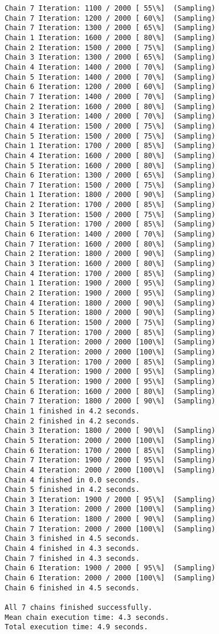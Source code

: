 \documentclass[11pt]{article}
\begin{document}
\begin{Verbatim}[commandchars=\\\{\}]
Chain 7 Iteration: 1100 / 2000 [ 55\%]  (Sampling)
Chain 7 Iteration: 1200 / 2000 [ 60\%]  (Sampling)
Chain 7 Iteration: 1300 / 2000 [ 65\%]  (Sampling)
Chain 1 Iteration: 1600 / 2000 [ 80\%]  (Sampling)
Chain 2 Iteration: 1500 / 2000 [ 75\%]  (Sampling)
Chain 3 Iteration: 1300 / 2000 [ 65\%]  (Sampling)
Chain 4 Iteration: 1400 / 2000 [ 70\%]  (Sampling)
Chain 5 Iteration: 1400 / 2000 [ 70\%]  (Sampling)
Chain 6 Iteration: 1200 / 2000 [ 60\%]  (Sampling)
Chain 7 Iteration: 1400 / 2000 [ 70\%]  (Sampling)
Chain 2 Iteration: 1600 / 2000 [ 80\%]  (Sampling)
Chain 3 Iteration: 1400 / 2000 [ 70\%]  (Sampling)
Chain 4 Iteration: 1500 / 2000 [ 75\%]  (Sampling)
Chain 5 Iteration: 1500 / 2000 [ 75\%]  (Sampling)
Chain 1 Iteration: 1700 / 2000 [ 85\%]  (Sampling)
Chain 4 Iteration: 1600 / 2000 [ 80\%]  (Sampling)
Chain 5 Iteration: 1600 / 2000 [ 80\%]  (Sampling)
Chain 6 Iteration: 1300 / 2000 [ 65\%]  (Sampling)
Chain 7 Iteration: 1500 / 2000 [ 75\%]  (Sampling)
Chain 1 Iteration: 1800 / 2000 [ 90\%]  (Sampling)
Chain 2 Iteration: 1700 / 2000 [ 85\%]  (Sampling)
Chain 3 Iteration: 1500 / 2000 [ 75\%]  (Sampling)
Chain 5 Iteration: 1700 / 2000 [ 85\%]  (Sampling)
Chain 6 Iteration: 1400 / 2000 [ 70\%]  (Sampling)
Chain 7 Iteration: 1600 / 2000 [ 80\%]  (Sampling)
Chain 2 Iteration: 1800 / 2000 [ 90\%]  (Sampling)
Chain 3 Iteration: 1600 / 2000 [ 80\%]  (Sampling)
Chain 4 Iteration: 1700 / 2000 [ 85\%]  (Sampling)
Chain 1 Iteration: 1900 / 2000 [ 95\%]  (Sampling)
Chain 2 Iteration: 1900 / 2000 [ 95\%]  (Sampling)
Chain 4 Iteration: 1800 / 2000 [ 90\%]  (Sampling)
Chain 5 Iteration: 1800 / 2000 [ 90\%]  (Sampling)
Chain 6 Iteration: 1500 / 2000 [ 75\%]  (Sampling)
Chain 7 Iteration: 1700 / 2000 [ 85\%]  (Sampling)
Chain 1 Iteration: 2000 / 2000 [100\%]  (Sampling)
Chain 2 Iteration: 2000 / 2000 [100\%]  (Sampling)
Chain 3 Iteration: 1700 / 2000 [ 85\%]  (Sampling)
Chain 4 Iteration: 1900 / 2000 [ 95\%]  (Sampling)
Chain 5 Iteration: 1900 / 2000 [ 95\%]  (Sampling)
Chain 6 Iteration: 1600 / 2000 [ 80\%]  (Sampling)
Chain 7 Iteration: 1800 / 2000 [ 90\%]  (Sampling)
Chain 1 finished in 4.2 seconds.
Chain 2 finished in 4.2 seconds.
Chain 3 Iteration: 1800 / 2000 [ 90\%]  (Sampling)
Chain 5 Iteration: 2000 / 2000 [100\%]  (Sampling)
Chain 6 Iteration: 1700 / 2000 [ 85\%]  (Sampling)
Chain 7 Iteration: 1900 / 2000 [ 95\%]  (Sampling)
Chain 4 Iteration: 2000 / 2000 [100\%]  (Sampling)
Chain 4 finished in 0.0 seconds.
Chain 5 finished in 4.2 seconds.
Chain 3 Iteration: 1900 / 2000 [ 95\%]  (Sampling)
Chain 3 Iteration: 2000 / 2000 [100\%]  (Sampling)
Chain 6 Iteration: 1800 / 2000 [ 90\%]  (Sampling)
Chain 7 Iteration: 2000 / 2000 [100\%]  (Sampling)
Chain 3 finished in 4.5 seconds.
Chain 4 finished in 4.3 seconds.
Chain 7 finished in 4.3 seconds.
Chain 6 Iteration: 1900 / 2000 [ 95\%]  (Sampling)
Chain 6 Iteration: 2000 / 2000 [100\%]  (Sampling)
Chain 6 finished in 4.5 seconds.

All 7 chains finished successfully.
Mean chain execution time: 4.3 seconds.
Total execution time: 4.9 seconds.

    \end{Verbatim}
\end{document}
